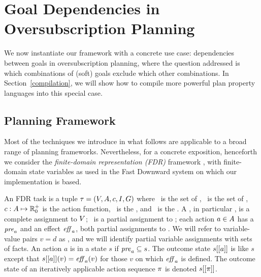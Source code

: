 \section{Goal Dependencies in Oversubscription Planning}
\label{goaldep}


We now instantiate our framework with a concrete use case:
dependencies between goals in oversubscription planning, where the
question addressed is which combinations of (soft) goals exclude which
other combinations. In Section~\ref{compilation}, we will show how to
compile more powerful plan property languages into this special case.




\subsection{Planning Framework}
\label{goaldep:planning}

Most of the techniques we introduce in what follows are applicable to
a broad range of planning frameworks. Nevertheless, for a concrete
exposition, henceforth we consider the \emph{finite-domain
  representation (FDR)} framework
\cite{backstrom:nebel:ci-95,helmert:ai-09}, with finite-domain state
variables as used in the Fast Downward system \cite{helmert:jair-06}
on which our implementation is based.

An FDR task  is a tuple $\tau =
(V,A,{c},I,G)$ where \vars\ is the set of
, \acts\ is the set of , ${c}:
A \mapsto {\mathbb{R}}^+_0$ is the action  function,
\init\ is the , and \goal\ is the
. A , in particular \init, is a complete
assignment to $V$; \goal\ is a partial assignment to \vars; each
action $a \in A$ has a  $\mathit{pre}_a$ and an
effect $\mathit{eff}_a$, both partial assignments to \vars. We will refer to
variable-value pairs $v=d$ as , and we will identify
partial variable assignments with sets of facts.
%
An action $a$ is  in a state $s$ if $\mathit{pre}_a
\subseteq s$. The outcome state $s[[a]]$ is like $s$ except that
$s[[a]](v) = \mathit{eff}_a(v)$ for those $v$ on which $\mathit{eff}_a$ is
defined. The outcome state of an iteratively applicable action
sequence $\pi$ is denoted $s[[\pi]]$.

